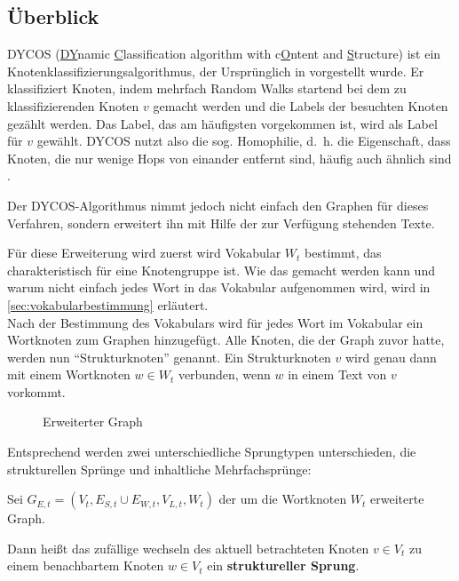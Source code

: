 \subsection{Überblick}
DYCOS (\underline{DY}namic \underline{C}lassification 
algorithm with c\underline{O}ntent and \underline{S}tructure) ist ein 
Knotenklassifizierungsalgorithmus, der Ursprünglich in \cite{aggarwal2011} vorgestellt 
wurde. Er klassifiziert Knoten, indem mehrfach Random Walks startend
bei dem zu klassifizierenden Knoten $v$ gemacht werden und die Labels
der besuchten Knoten gezählt werden. Das Label, das am häufigsten
vorgekommen ist, wird als Label für $v$ gewählt.
DYCOS nutzt also die sog. Homophilie, d.~h. die Eigenschaft, dass
Knoten, die nur wenige Hops von einander entfernt sind, häufig auch
ähnlich sind \cite{bhagat}.

Der DYCOS-Algorithmus nimmt jedoch nicht einfach den Graphen für 
dieses Verfahren, sondern erweitert ihn mit Hilfe der zur Verfügung
stehenden Texte.

Für diese Erweiterung wird zuerst wird Vokabular $W_t$ bestimmt, das 
charakteristisch für eine Knotengruppe ist. Wie das gemacht werden kann
und warum nicht einfach jedes Wort in das Vokabular aufgenommen wird,
wird in \cref{sec:vokabularbestimmung} erläutert.\\
Nach der Bestimmung des Vokabulars wird für 
jedes Wort im Vokabular ein Wortknoten zum Graphen hinzugefügt. Alle
Knoten, die der Graph zuvor hatte, werden nun \enquote{Strukturknoten}
genannt.
Ein Strukturknoten $v$ wird genau dann mit einem Wortknoten $w \in W_t$
verbunden, wenn $w$ in einem Text von $v$ vorkommt.

\begin{figure}[htp]
    \centering
    
    \caption{Erweiterter Graph}
    \label{fig:erweiterter-graph}
\end{figure}

Entsprechend werden zwei unterschiedliche Sprungtypen unterschieden,
die strukturellen Sprünge und inhaltliche Mehrfachsprünge:

\begin{definition}
    Sei $G_{E,t} = (V_t, E_{S,t} \cup E_{W,t}, V_{L,t}, W_{t})$ der
    um die Wortknoten $W_{t}$ erweiterte Graph.

    Dann heißt das zufällige wechseln des aktuell betrachteten
    Knoten $v \in V_t$ zu einem benachbartem Knoten $w \in V_t$
    ein \textbf{struktureller Sprung}.
\end{definition}

